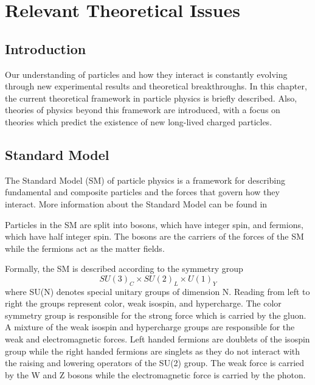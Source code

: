 \chapter{Relevant Theoretical Issues \label{sec:theory}}

\section{Introduction}
Our understanding of particles and how they interact is constantly evolving through new experimental results and theoretical breakthroughs.
In this chapter, the current theoretical framework in particle physics is briefly described. Also, theories of physics beyond this framework are introduced,
with a focus on theories which predict the existence of new long-lived charged particles.

\section{Standard Model \label{sec:SM}}
The Standard Model (SM) of particle physics is a framework for describing fundamental and composite particles and the forces that govern how they interact. 
More information about the Standard Model can be found in~\cite{Srednicki_2007, griffiths2008introduction}

Particles in the SM are split into bosons, which have integer spin, and fermions, which have half integer spin.
The bosons are the carriers of the forces of the SM while the fermions act as the matter fields.


Formally, the SM is described according to the symmetry group
\begin{equation}
SU(3)_C \times SU(2)_L \times U(1)_Y
\label{eq:SMGroups}
\end{equation}
where SU(N) denotes special unitary groups of dimension N. 
Reading from left to right the groups represent color, weak isospin, and hypercharge. 
The color symmetry group is responsible for the strong force which is carried by the gluon.
A mixture of the weak isospin and hypercharge groups are responsible for the weak and electromagnetic forces. Left handed fermions are doublets of the
isospin group while the right handed fermions are singlets as they do not interact with the raising and lowering operators of the SU(2) group.
The weak force is carried by the W and Z bosons while the electromagnetic force is carried by the photon.

